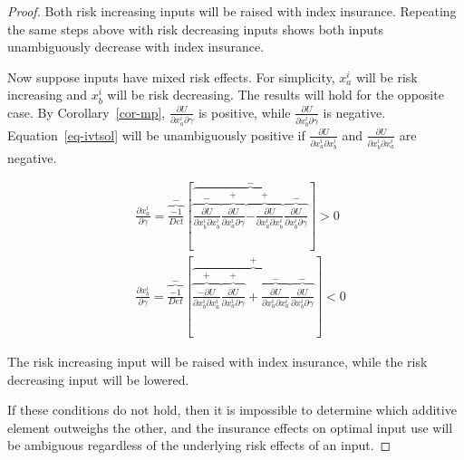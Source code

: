 \documentclass[
  letterpaper,
  DIV=11,
  numbers=noendperiod]{scrartcl}
\theoremstyle{plain}
\theoremstyle{plain}
\theoremstyle{remark}
\begin{document}
\begin{proof}
Both risk increasing inputs will be raised with index insurance.
Repeating the same steps above with risk decreasing inputs shows both
inputs unambiguously decrease with index insurance.

Now suppose inputs have mixed risk effects. For simplicity, \(x^i_a\)
will be risk increasing and \(x^i_b\) will be risk decreasing. The
results will hold for the opposite case. By Corollary~\ref{cor-mp},
\(\frac{\partial U}{\partial x^i_a\partial \gamma}\) is positive, while
\(\frac{\partial U}{\partial x^i_b\partial \gamma}\) is negative.
Equation~\ref{eq-ivtsol} will be unambiguously positive if
\(\frac{\partial U}{\partial x^i_a\partial x^i_b}\) and
\(\frac{\partial U}{\partial x^i_b\partial x^i_a}\) are negative.

\[
\begin{aligned}
&\frac{\partial x^i_a}{\partial \gamma}=\overbrace{\frac{-1}{Det}}^{-}\left[\overbrace{\overbrace{\frac{\partial U}{\partial x^i_b\partial x^i_b}}^{-}\overbrace{\frac{\partial U}{\partial x^i_a \partial \gamma}}^{+}\overbrace{-\frac{\partial U}{\partial x^i_a \partial x^i_b}}^{+}\overbrace{\frac{\partial U}{\partial x^i_b\partial \gamma}}^{-}}^{-}\right] >0\\
&\frac{\partial x^i_b}{\partial \gamma}=\overbrace{\frac{-1}{Det}}^{-}\left[\overbrace{\overbrace{\frac{-\partial U}{\partial x^i_b\partial x^i_a}}^{+}\overbrace{\frac{\partial U}{\partial x^i_a \partial \gamma}}^{+}+\overbrace{\frac{\partial U}{\partial x^i_a \partial x^i_a}}^{-}\overbrace{\frac{\partial U}{\partial x^i_b\partial \gamma}}^{-}}^{+}\right]<0
\end{aligned}
\]

The risk increasing input will be raised with index insurance, while the
risk decreasing input will be lowered.

If these conditions do not hold, then it is impossible to determine
which additive element outweighs the other, and the insurance effects on
optimal input use will be ambiguous regardless of the underlying risk
effects of an input.

\end{proof}
\end{document}
